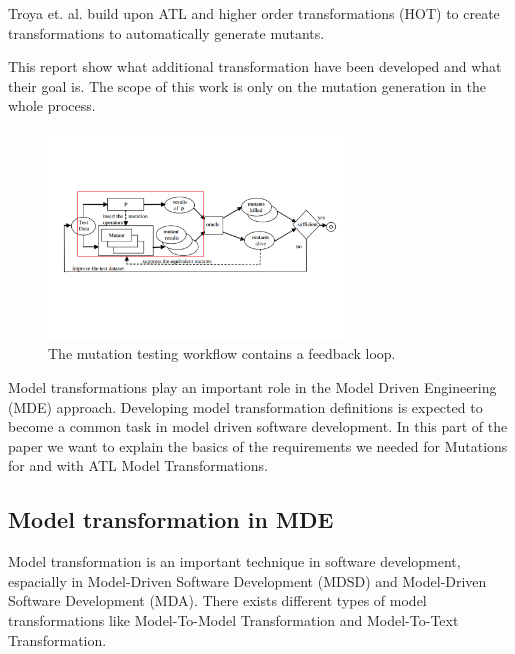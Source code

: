 \documentclass{llncs}
\begin{document}
Troya et. al. build upon ATL and higher order transformations (HOT) to create transformations to automatically generate mutants. 

This report show what additional transformation have been developed and what their goal is. The scope of this work is only on the mutation generation in the whole process.

\begin{figure}
	\centering
	\includegraphics[width=0.7\textwidth]{figures/Marked_Mutation_Process}
	\caption{The mutation testing workflow contains a feedback loop.\cite{MatMottu2006}}
	\label{fig:Marked_Mutation_Process}
\end{figure}


Model transformations play an important role in the Model Driven Engineering
(MDE) approach. Developing model transformation definitions is expected to
become a common task in model driven software development. \cite{atl:frederic}
In this part of the paper we want to explain the basics of the requirements we needed for Mutations for and with ATL Model Transformations.

\subsection{Model transformation in MDE}
Model transformation is an important technique in software development, espacially in Model-Driven Software Development (MDSD) and Model-Driven Software Development (MDA). There exists different types of model transformations like Model-To-Model Transformation and Model-To-Text Transformation.  
\end{document}
